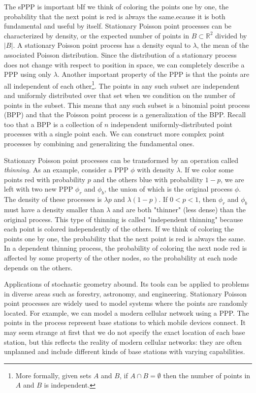 \documentclass[]{article}
\begin{document}
The sPPP is important bIf we think of coloring the points one by one, the probability that the next point is red is always the same.ecause it is both fundamental and useful by itself. Stationary Poisson point processes can be characterized by density, or the expected number of points in $B \subset \mathbb{R}^2$ divided by $|B|$. A stationary Poisson point process has a density equal to $\lambda$, the mean of the associated Poisson distribution. Since the distribution of a stationary process does not change with respect to position in space, we can completely describe a PPP using only $\lambda$. Another important property of the PPP is that the points are all independent of each other\footnote{More formally, given sets $A$ and $B$, if $A \cap B = \emptyset$ then the number of points in $A$ and $B$ is independent.}. The points in any such subset are independent and uniformly distributed over that set when we condition on the number of points in the subset. This means that any such subset is a binomial point process (BPP) and that the Poisson point process is a generalization of the BPP. Recall too that a BPP is a collection of $n$ independent uniformly-distributed point processes with a single point each. We can construct more complex point processes by combining and generalizing the fundamental ones.

Stationary Poisson point processes can be transformed by an operation called \textit{thinning}. As an example, consider a PPP $\phi$ with density $\lambda$. If we color some points red with probability $p$ and the others blue with probability $1-p$, we are left with two new PPP $\phi_r$ and $\phi_b$, the union of which is the original process $\phi$. The density of these processes is $\lambda p$ and $\lambda (1-p)$.
If $0 < p < 1$, then $\phi_r$ and $\phi_b$ must have a density smaller than $\lambda$ and are both "thinner" (less dense) than the original process. This type of thinning is called "independent thinning" because each point is colored independently of the others. If we think of coloring the points one by one, the probability that the next point is red is always the same. In a dependent thinning process, the probability of coloring the next node red is affected by some property of the other nodes, so the probability at each node depends on the others.

Applications of stochastic geometry abound. Its tools can be applied to problems in diverse areas such as forestry, astronomy, and engineering. Stationary Poisson point processes are widely used to model systems where the points are randomly located. For example, we can model a modern cellular network using a PPP. The points in the process represent base stations to which mobile devices connect.  It may seem strange at first that we do not specify the exact location of each base station, but this reflects the reality of modern cellular networks: they are often unplanned and include different kinds of base stations with varying capabilities.
\end{document}

